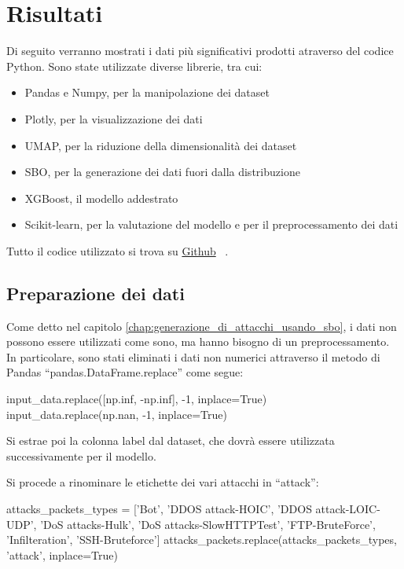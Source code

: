 \chapter{Risultati}
\label{chap:risultati}

Di seguito verranno mostrati i dati più significativi prodotti atraverso del codice Python. Sono state utilizzate diverse librerie, tra cui:

\begin{itemize}
    \item Pandas e Numpy, per la manipolazione dei dataset
    \item Plotly, per la visualizzazione dei dati
    \item UMAP, per la riduzione della dimensionalità dei dataset 
    \item SBO, per la generazione dei dati fuori dalla distribuzione
    \item XGBoost, il modello addestrato
    \item Scikit-learn, per la valutazione del modello e per il preprocessamento dei dati
\end{itemize}

Tutto il codice utilizzato si trova su \href{https://github.com/guglielmobartelloni/thesis-utils}{Github}~\cite{github} .

\section{Preparazione dei dati}

Come detto nel capitolo \ref{chap:generazione_di_attacchi_usando_sbo}, i dati non possono essere utilizzati come sono, ma hanno bisogno di un preprocessamento. In particolare, sono stati eliminati i dati non numerici attraverso il metodo di Pandas ``pandas.DataFrame.replace'' come segue:


\begin{python}
input_data.replace([np.inf, -np.inf], -1, inplace=True)
input_data.replace(np.nan, -1, inplace=True)
\end{python}

Si estrae poi la colonna label dal dataset, che dovrà essere utilizzata successivamente per il modello.

Si procede a rinominare le etichette dei vari attacchi in ``attack'':

\begin{python}
attacks_packets_types = ['Bot', 'DDOS attack-HOIC', 'DDOS attack-LOIC-UDP',
                          'DoS attacks-Hulk', 'DoS attacks-SlowHTTPTest', 
                          'FTP-BruteForce', 
                          'Infilteration', 'SSH-Bruteforce']
attacks_packets.replace(attacks_packets_types, 'attack', inplace=True)
\end{python}

